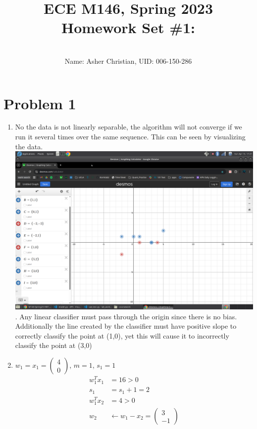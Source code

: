 \documentclass[11pt]{article}
\newcommand{\cnum}{ECE M146}
\newcommand{\ced}{Spring 2023}
\newcommand{\ctitle}[4]{\title{\vspace{-0.5in}\cnum, \ced\\Homework Set #1: #2}\author{\vspace{-0.35in}\\Name: #3, UID: #4}}
\newcommand{\solution}[1]{{{\color{blue}{\bf Solution:} {#1}}}}
\begin{document}
\ctitle{\#1}{}{Asher Christian}{006-150-286}
\date{}
\maketitle
\vspace{-0.75in}
\section{Problem 1}
\solution{
    \begin{enumerate}
        \item No the data is not linearly separable, the algorithm will not converge if we run it several times over the same sequence. This can be seen by visualizing the data.
            \includegraphics[width=\textwidth]{q1.png}. Any linear classifier must pass through the origin since there is no bias. Additionally the line created by the classifier
            must have positive slope to correctly classify the point at (1,0), yet this will cause it to incorrectly classify the point at (3,0)
        \item $w_1 = x_1 = \begin{pmatrix} 4 \\ 0 \end{pmatrix} $, $m=1$, $s_1 = 1$
            \begin{align*}
                w_1^{T}x_1 &= 16 > 0\\
                s_1 &= s_1 + 1 = 2\\
                w_1^{T}x_2 &= 4 > 0\\
                w_2 &\leftarrow w_1 - x_2 = \begin{pmatrix} 3 \\ -1 \end{pmatrix} \\

\end{align*}
\end{enumerate}}
\end{document}
